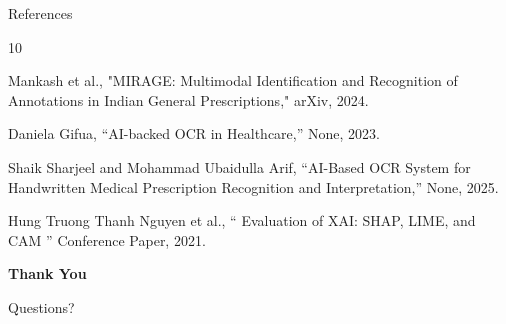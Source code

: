 \documentclass[11pt,aspectratio=169]{beamer}
\begin{document}
\begin{frame}{References}

\begin{thebibliography}{10}

Mankash et al., "MIRAGE: Multimodal Identification and Recognition of Annotations in Indian General Prescriptions," arXiv, 2024.

Daniela Gifua, ``AI-backed OCR in Healthcare,'' None, 2023.

Shaik Sharjeel and Mohammad Ubaidulla Arif, ``AI-Based OCR System for Handwritten Medical Prescription Recognition and Interpretation,'' None, 2025.

Hung Truong Thanh Nguyen et al., `` Evaluation of XAI: SHAP, LIME, and CAM '' Conference Paper, 2021.



\end{thebibliography}

\end{frame}




\begin{frame}[plain]


\vspace{3cm}

\centering

{\color{white}\fontsize{34}{36}\selectfont\bfseries
Thank You
}

\vspace{0.4cm}

{\color{medixAccent}\Large
Questions?
}

\end{frame}
\end{document}

